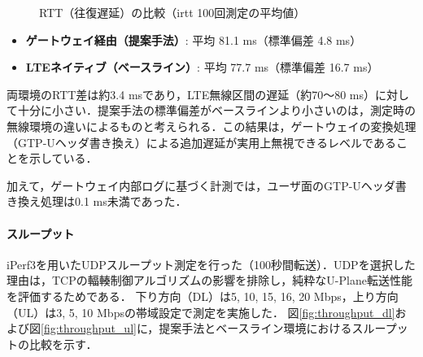 \begin{figure}[htbp]
  \centering
  \caption{RTT（往復遅延）の比較（irtt 100回測定の平均値）}
  \label{fig:rtt_comparison}
\end{figure}

\begin{itemize}
    \item \textbf{ゲートウェイ経由（提案手法）}: 平均 81.1 ms（標準偏差 4.8 ms）
    \item \textbf{LTEネイティブ（ベースライン）}: 平均 77.7 ms（標準偏差 16.7 ms）
\end{itemize}
両環境のRTT差は約3.4 msであり，LTE無線区間の遅延（約70〜80 ms）に対して十分に小さい．提案手法の標準偏差がベースラインより小さいのは，測定時の無線環境の違いによるものと考えられる．この結果は，ゲートウェイの変換処理（GTP-Uヘッダ書き換え）による追加遅延が実用上無視できるレベルであることを示している．

加えて，ゲートウェイ内部ログに基づく計測では，ユーザ面のGTP-Uヘッダ書き換え処理は0.1 ms未満であった．

\paragraph{スループット}
iPerf3を用いたUDPスループット測定を行った（100秒間転送）．UDPを選択した理由は，TCPの輻輳制御アルゴリズムの影響を排除し，純粋なU-Plane転送性能を評価するためである．
下り方向（DL）は5, 10, 15, 16, 20 Mbps，上り方向（UL）は3, 5, 10 Mbpsの帯域設定で測定を実施した．
図\ref{fig:throughput_dl}および図\ref{fig:throughput_ul}に，提案手法とベースライン環境におけるスループットの比較を示す．

